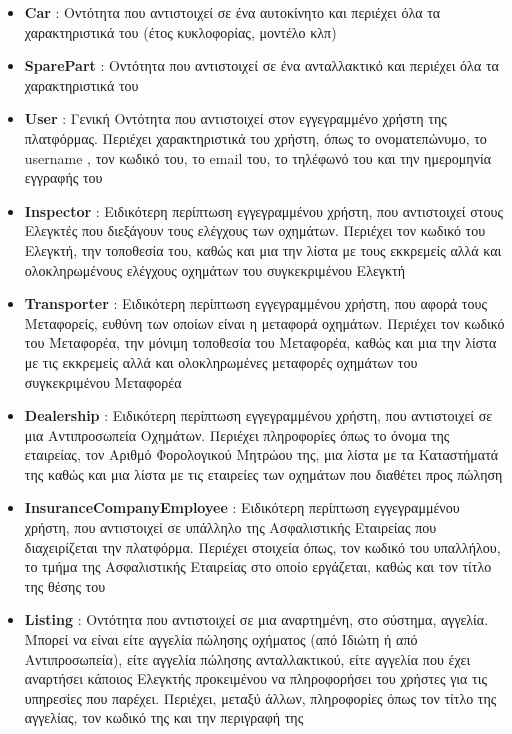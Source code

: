 \documentclass{../ol-softwaremanual}
\begin{document}
	\begin{itemize}
		\item \en \textbf{Car} \gr : Οντότητα που αντιστοιχεί σε ένα αυτοκίνητο και περιέχει όλα τα χαρακτηριστικά του (έτος κυκλοφορίας, μοντέλο κλπ)		
		\item \en \textbf{SparePart} \gr : Οντότητα που αντιστοιχεί σε ένα ανταλλακτικό και περιέχει όλα τα χαρακτηριστικά του
		\item \en \textbf{User} \gr : Γενική Οντότητα που αντιστοιχεί στον εγγεγραμμένο χρήστη της πλατφόρμας. Περιέχει χαρακτηριστικά του χρήστη, όπως το ονοματεπώνυμο, το \en username \gr, τον κωδικό του, το \en email \gr του, το τηλέφωνό του και την ημερομηνία εγγραφής του
		\item \en \textbf{Inspector} \gr : Ειδικότερη περίπτωση εγγεγραμμένου χρήστη, που αντιστοιχεί στους Ελεγκτές που διεξάγουν τους ελέγχους των οχημάτων. Περιέχει τον κωδικό του Ελεγκτή, την τοποθεσία του, καθώς και μια την λίστα με τους εκκρεμείς αλλά και ολοκληρωμένους ελέγχους οχημάτων του συγκεκριμένου Ελεγκτή
		\item \en \textbf{Transporter} \gr : Ειδικότερη περίπτωση εγγεγραμμένου χρήστη, που αφορά τους Μεταφορείς, ευθύνη των οποίων είναι η μεταφορά οχημάτων. Περιέχει τον κωδικό του Μεταφορέα, την μόνιμη τοποθεσία του Μεταφορέα, καθώς και μια την λίστα με τις εκκρεμείς αλλά και ολοκληρωμένες μεταφορές οχημάτων του συγκεκριμένου Μεταφορέα
		\item \en \textbf{Dealership} \gr : Ειδικότερη περίπτωση εγγεγραμμένου χρήστη, που αντιστοιχεί σε μια Αντιπροσωπεία Οχημάτων. Περιέχει πληροφορίες όπως το όνομα της εταιρείας, τον Αριθμό Φορολογικού Μητρώου της, μια λίστα με τα Καταστήματά της καθώς και μια λίστα με τις εταιρείες των οχημάτων που διαθέτει προς πώληση
		\item \en \textbf{InsuranceCompanyEmployee} \gr : Ειδικότερη περίπτωση εγγεγραμμένου χρήστη, που αντιστοιχεί σε υπάλληλο της Ασφαλιστικής Εταιρείας που διαχειρίζεται την πλατφόρμα. Περιέχει στοιχεία όπως, τον κωδικό του υπαλλήλου, το τμήμα της Ασφαλιστικής Εταιρείας στο οποίο εργάζεται, καθώς και τον τίτλο της θέσης του
		\item \en \textbf{Listing} \gr : Οντότητα που αντιστοιχεί σε μια αναρτημένη, στο σύστημα, αγγελία. Μπορεί να είναι είτε αγγελία πώλησης οχήματος (από Ιδιώτη ή από Αντιπροσωπεία), είτε αγγελία πώλησης ανταλλακτικού, είτε αγγελία που έχει αναρτήσει κάποιος Ελεγκτής προκειμένου να πληροφορήσει του χρήστες για τις υπηρεσίες που παρέχει. Περιέχει, μεταξύ άλλων, πληροφορίες όπως τον τίτλο της αγγελίας, τον κωδικό της και την περιγραφή της

\end{itemize}
\end{document}
